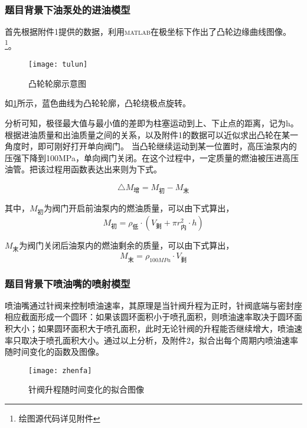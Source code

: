 \documentclass[withoutpreface,bwprint]{cumcmthesis} %
\begin{document}
\subsubsection{题目背景下油泵处的进油模型}\label{case2}
首先根据附件1提供的数据，利用\textsc{matlab}在极坐标下作出了凸轮边缘曲线图像。\footnote{绘图源代码详见附件}。

\begin{figure}[!h]
	\centering 
	\texttt{[image: tulun]}
	\caption{凸轮轮廓示意图}
	\label{fig:tulun-picture}
\end{figure}

如\cref{fig:tulun-picture}所示，蓝色曲线为凸轮轮廓，凸轮绕极点旋转。

\newpage

分析可知，极径最大值与最小值的差即为柱塞运动到上、下止点的距离，记为h。根据进油质量和出油质量之间的关系，以及附件1的数据可以近似求出凸轮在某一角度时，即可刚好打开单向阀门。 当凸轮继续运动到某一位置时，高压油泵内的压强下降到100MPa，单向阀门关闭。在这个过程中，一定质量的燃油被压进高压油管。把该过程用函数表达出来则为下式。

\begin{equation}
\triangle M_{\text{增}}= M_{\text{初}}-M_{\text{末}}\label{eq:ques3-5}
\end{equation}

其中，$M_{\text{初}}$为阀门开启前油泵内的燃油质量，可以由下式算出，
\begin{equation*}
M_{\text{初}} = \rho_{\text{低}}\cdot (V_{\text{剩}}+\pi r^{2}_{\text{内}}\cdot h)\label{eq:ques3-6}
\end{equation*}

$M_{\text{末}}$为阀门关闭后油泵内的燃油剩余的质量，可以由下式算出，
\begin{equation*}
M_{\text{末}} = \rho_{100MPa}\cdot V_{\text{剩}}\label{eq:ques3-7}
\end{equation*}

\subsubsection{题目背景下喷油嘴的喷射模型}\label{case3}
喷油嘴通过针阀来控制喷油速率，其原理是当针阀升程为正时，针阀底端与密封座相应截面形成一个圆环：如果该圆环面积小于喷孔面积，则喷油速率取决于圆环面积大小；如果圆环面积大于喷孔面积，此时无论针阀的升程能否继续增大，喷油速率只取决于喷孔面积大小。通过以上分析，及附件2，拟合出每个周期内喷油速率随时间变化的函数及图像。

\begin{figure}[!h]
	\centering 
	\texttt{[image: zhenfa]}
	\caption{针阀升程随时间变化的拟合图像}
	\label{fig:Q(t)-picture}
\end{figure}
\end{document}
